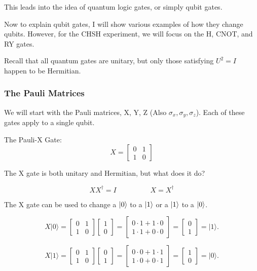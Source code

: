 \documentclass[12pt]{article}
\begin{document}
This leads into the idea of quantum logic gates, or simply qubit gates.\cite{Quantum_Information} 

Now to explain qubit gates, I will show various examples of how they change qubits. However, for the CHSH experiment, we will focus on the H, CNOT, and RY gates.

Recall that all quantum gates are unitary, but only those satisfying $U^2=I$ happen to be Hermitian.

\subsubsection{The Pauli Matrices}

We will start with the Pauli matrices, X, Y, Z (Also $\sigma_x, \sigma_y, \sigma_z$). Each of these gates apply to a single qubit. 

The Pauli-X Gate:
$$
X = \begin{bmatrix}
0 & 1 \\
1 & 0
\end{bmatrix}
$$

The X gate is both unitary and Hermitian, but what does it do?

$$
XX^\dagger = I \hspace{2cm} X = X^\dagger
$$


The X gate can be used to change a $\ket{0}$ to a $\ket{1}$ or a $\ket{1}$ to a $\ket{0}$. 



$$
X \vert 0 \rangle = 
\begin{bmatrix} 0 & 1 \\ 1 & 0 \end{bmatrix}
\begin{bmatrix} 1 \\ 0 \end{bmatrix}
=
\begin{bmatrix} 0\cdot1 + 1\cdot0 \\ 1\cdot1 + 0\cdot0 \end{bmatrix}
=
\begin{bmatrix} 0 \\ 1 \end{bmatrix} = \vert 1 \rangle.
$$

$$
X \vert 1 \rangle = 
\begin{bmatrix} 0 & 1 \\ 1 & 0 \end{bmatrix}
\begin{bmatrix} 0 \\ 1 \end{bmatrix}
=
\begin{bmatrix} 0\cdot 0 + 1\cdot 1 \\ 1\cdot 0 + 0\cdot 1 \end{bmatrix}
=
\begin{bmatrix} 1 \\ 0 \end{bmatrix}
= \vert 0 \rangle.
$$
\end{document}
